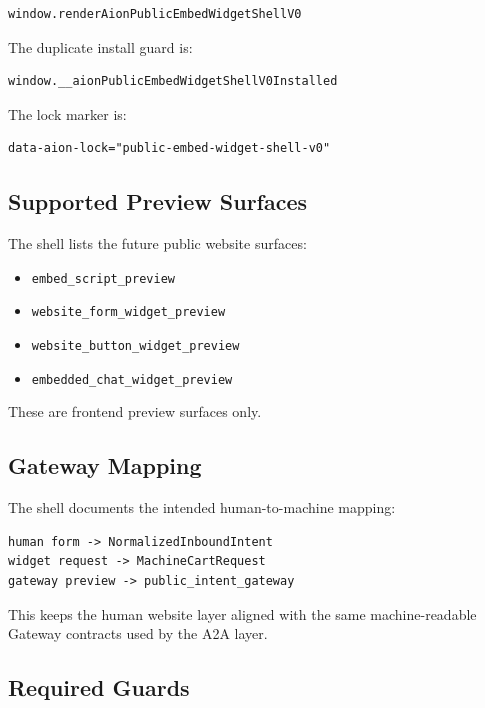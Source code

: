 \begin{verbatim}
window.renderAionPublicEmbedWidgetShellV0
\end{verbatim}

The duplicate install guard is:

\begin{verbatim}
window.__aionPublicEmbedWidgetShellV0Installed
\end{verbatim}

The lock marker is:

\begin{verbatim}
data-aion-lock="public-embed-widget-shell-v0"
\end{verbatim}

\subsection{Supported Preview Surfaces}

The shell lists the future public website surfaces:

\begin{itemize}
  \item \texttt{embed\_script\_preview}
  \item \texttt{website\_form\_widget\_preview}
  \item \texttt{website\_button\_widget\_preview}
  \item \texttt{embedded\_chat\_widget\_preview}
\end{itemize}

These are frontend preview surfaces only.

\subsection{Gateway Mapping}

The shell documents the intended human-to-machine mapping:

\begin{verbatim}
human form -> NormalizedInboundIntent
widget request -> MachineCartRequest
gateway preview -> public_intent_gateway
\end{verbatim}

This keeps the human website layer aligned with the same machine-readable Gateway contracts used by the A2A layer.

\subsection{Required Guards}


